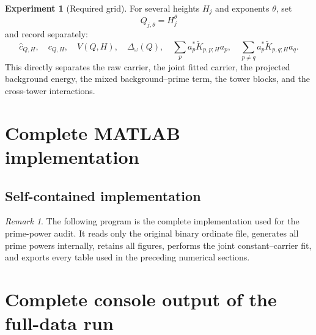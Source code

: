 \documentclass[11pt]{amsart}
\numberwithin{equation}{section}
\theoremstyle{plain}
\theoremstyle{definition}
\newtheorem{experiment}[theorem]{Experiment}
\theoremstyle{remark}
\newtheorem{remark}[theorem]{Remark}
\newcommand{\1}{\mathbf{1}}
\begin{document}
\begin{experiment}[Required grid]
\label{exp:required_height_cutoff_grid}
For several heights $H_j$ and exponents $\theta$, set
\begin{equation}
Q_{j,\theta}=H_j^\theta
\label{eq:numerical_Q_theta_grid}
\end{equation}
and record separately:
\begin{equation}
\widehat c_{Q,H},
\quad
c_{Q,H},
\quad
V(Q,H),
\quad
\Delta_\omega(Q),
\quad
\sum_p a_p^\ast\widetilde K_{p,p;H}a_p,
\quad
\sum_{p\neq q}a_p^\ast\widetilde K_{p,q;H}a_q.
\label{eq:numerical_required_grid_outputs}
\end{equation}
This directly separates the raw carrier, the joint fitted carrier, the
projected background energy, the mixed background--prime term, the tower
blocks, and the cross-tower interactions.
\end{experiment}



\section{Complete MATLAB implementation}
\label{sec:numerical_complete_matlab}

\subsection{Self-contained implementation}
\label{subsec:numerical_self_contained_implementation}

\begin{remark}
\label{rem:complete_matlab_scope}
The following program is the complete implementation used for the
prime-power audit.  It reads only the original binary ordinate file,
generates all prime powers internally, retains all figures, performs the
joint constant--carrier fit, and exports every table used in the preceding
numerical sections.
\end{remark}



\section{Complete console output of the full-data run}
\label{sec:numerical_complete_output}
\end{document}
